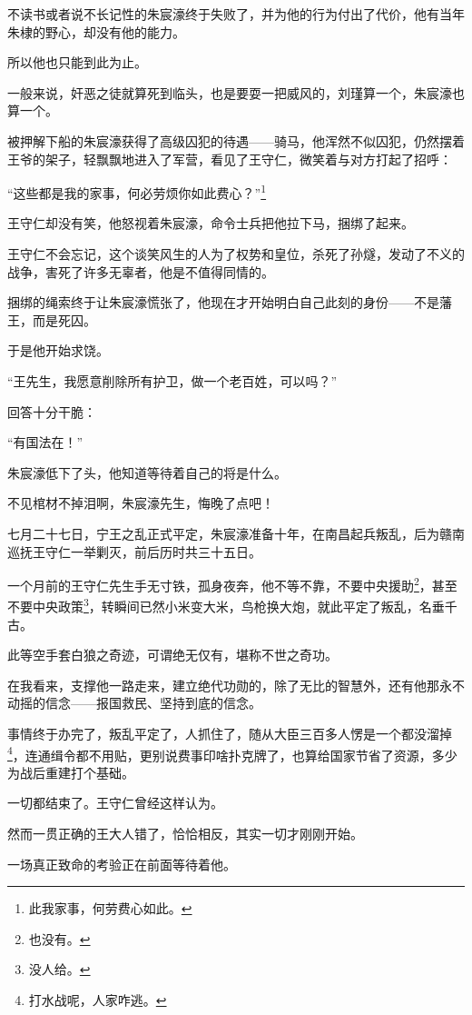 \begin{multicols}{\theparacolNo}
不读书或者说不长记性的朱宸濠终于失败了，并为他的行为付出了代价，他有当年朱棣的野心，却没有他的能力。

所以他也只能到此为止。

一般来说，奸恶之徒就算死到临头，也是要耍一把威风的，刘瑾算一个，朱宸濠也算一个。

被押解下船的朱宸濠获得了高级囚犯的待遇——骑马，他浑然不似囚犯，仍然摆着王爷的架子，轻飘飘地进入了军营，看见了王守仁，微笑着与对方打起了招呼：

“这些都是我的家事，何必劳烦你如此费心？”\footnote{此我家事，何劳费心如此。}

王守仁却没有笑，他怒视着朱宸濠，命令士兵把他拉下马，捆绑了起来。

王守仁不会忘记，这个谈笑风生的人为了权势和皇位，杀死了孙燧，发动了不义的战争，害死了许多无辜者，他是不值得同情的。

捆绑的绳索终于让朱宸濠慌张了，他现在才开始明白自己此刻的身份——不是藩王，而是死囚。

于是他开始求饶。

“王先生，我愿意削除所有护卫，做一个老百姓，可以吗？”

回答十分干脆：

“有国法在！”

朱宸濠低下了头，他知道等待着自己的将是什么。

不见棺材不掉泪啊，朱宸濠先生，悔晚了点吧！

七月二十七日，宁王之乱正式平定，朱宸濠准备十年，在南昌起兵叛乱，后为赣南巡抚王守仁一举剿灭，前后历时共三十五日。

一个月前的王守仁先生手无寸铁，孤身夜奔，他不等不靠，不要中央援助\footnote{也没有。}，甚至不要中央政策\footnote{没人给。}，转瞬间已然小米变大米，鸟枪换大炮，就此平定了叛乱，名垂千古。

此等空手套白狼之奇迹，可谓绝无仅有，堪称不世之奇功。

在我看来，支撑他一路走来，建立绝代功勋的，除了无比的智慧外，还有他那永不动摇的信念——报国救民、坚持到底的信念。

事情终于办完了，叛乱平定了，人抓住了，随从大臣三百多人愣是一个都没溜掉\footnote{打水战呢，人家咋逃。}，连通缉令都不用贴，更别说费事印啥扑克牌了，也算给国家节省了资源，多少为战后重建打个基础。

一切都结束了。王守仁曾经这样认为。

然而一贯正确的王大人错了，恰恰相反，其实一切才刚刚开始。

一场真正致命的考验正在前面等待着他。
\ifnum{}
	\end{multicols}
\fi
\newpage
